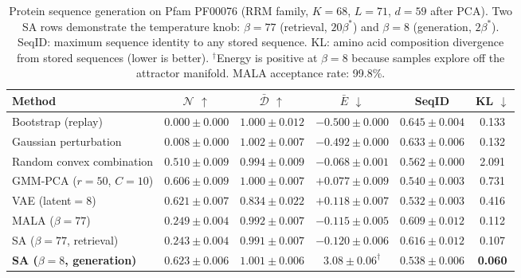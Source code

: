 \begin{table}[h]
\centering
\caption{Protein sequence generation on Pfam PF00076 (RRM family, $K{=}68$, $L{=}71$, $d{=}59$ after PCA). Two SA rows demonstrate the temperature knob: $\beta{=}77$ (retrieval, $20\beta^*$) and $\beta{=}8$ (generation, $2\beta^*$). SeqID: maximum sequence identity to any stored sequence. KL: amino acid composition divergence from stored sequences (lower is better). $^\dagger$Energy is positive at $\beta{=}8$ because samples explore off the attractor manifold. MALA acceptance rate: 99.8\%.}
\label{tab:protein}
\small
\begin{tabular}{@{}lccccc@{}}
\toprule
Method & $\mathcal{N}$ $\uparrow$ & $\bar{\mathcal{D}}$ $\uparrow$ & $\bar{E}$ $\downarrow$ & SeqID & KL $\downarrow$ \\
\midrule
Bootstrap (replay)          & $0.000 \pm 0.000$ & $1.000 \pm 0.012$ & $-0.500 \pm 0.000$ & $0.645 \pm 0.004$ & 0.133 \\
Gaussian perturbation       & $0.008 \pm 0.000$ & $1.002 \pm 0.007$ & $-0.492 \pm 0.000$ & $0.633 \pm 0.006$ & 0.132 \\
Random convex combination   & $0.510 \pm 0.009$ & $0.994 \pm 0.009$ & $-0.068 \pm 0.001$ & $0.562 \pm 0.000$ & 2.091 \\
GMM-PCA ($r{=}50$, $C{=}10$) & $0.606 \pm 0.009$ & $1.000 \pm 0.007$ & $+0.077 \pm 0.009$ & $0.540 \pm 0.003$ & 0.731 \\
VAE (latent${=}8$)          & $0.621 \pm 0.007$ & $0.834 \pm 0.022$ & $+0.118 \pm 0.007$ & $0.532 \pm 0.003$ & 0.416 \\
MALA ($\beta{=}77$)         & $0.249 \pm 0.004$ & $0.992 \pm 0.007$ & $-0.115 \pm 0.005$ & $0.609 \pm 0.012$ & 0.112 \\
SA ($\beta{=}77$, retrieval) & $0.243 \pm 0.004$ & $0.991 \pm 0.007$ & $-0.120 \pm 0.006$ & $0.616 \pm 0.012$ & 0.107 \\
\textbf{SA ($\beta{=}8$, generation)} & $\mathbf{0.623 \pm 0.006}$ & $\mathbf{1.001 \pm 0.006}$ & $3.08 \pm 0.06^\dagger$ & $\mathbf{0.538 \pm 0.006}$ & \textbf{0.060} \\
\bottomrule
\end{tabular}
\end{table}

